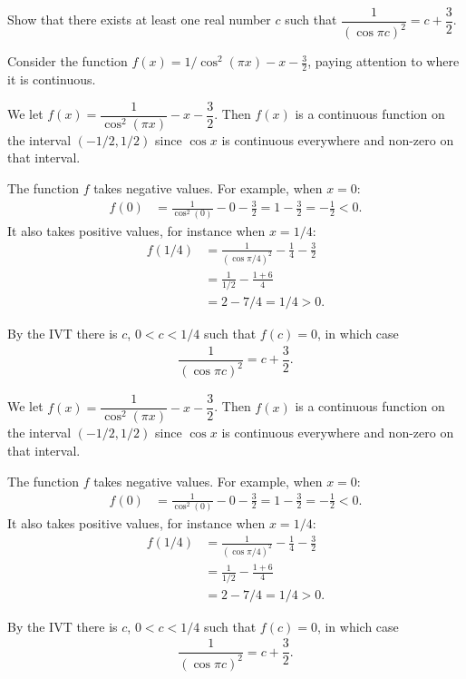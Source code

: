 \begin{question}[2015Q]
Show that there exists at least one real number $c$ such that
$\dfrac{1}{(\cos\pi c)^2} = c+\dfrac{3}{2}$.
\end{question}
\begin{hint}
Consider the function $f(x)=1/\cos^2(\pi x)-x-\frac{3}{2}$, paying attention to where it is continuous.
\end{hint}
\begin{answer}
We let $f(x)=\dfrac{1}{\cos^2(\pi x)}-x-\dfrac{3}{2}$. Then $f(x)$ is a continuous function on the
interval $(-1/2, 1/2)$ since $\cos x$ is continuous everywhere and non-zero on that
interval.

The function $f$ takes negative values.  For example, when $x=0$:
\begin{align*}
f(0) &= \frac{1}{\cos^2(0)} - 0 - \frac{3}{2} = 1-\frac{3}{2} = -\frac{1}{2} <0.
\end{align*}
It also takes positive values, for instance when $x=1/4$:
\begin{align*}
f(1/4) &= \frac{1}{(\cos \pi/4)^2} - \frac{1}{4} - \frac{3}{2} \\
  &= \frac{1}{1/2} - \frac{1+6}{4} \\
  &= 2 - 7/4 = 1/4 >0.
\end{align*}

By the IVT there is $c$, $0<c<1/4$ such that $f(c)=0$, in which case
\begin{align*}
\dfrac{1}{(\cos\pi c)^2} = c+\dfrac{3}{2}.
\end{align*}
\end{answer}
\begin{solution}
We let $f(x)=\dfrac{1}{\cos^2(\pi x)}-x-\dfrac{3}{2}$. Then $f(x)$ is a continuous function on the
interval $(-1/2, 1/2)$ since $\cos x$ is continuous everywhere and non-zero on that
interval.

The function $f$ takes negative values.  For example, when $x=0$:
\begin{align*}
f(0) &= \frac{1}{\cos^2(0)} - 0 - \frac{3}{2} = 1-\frac{3}{2} = -\frac{1}{2} <0.
\end{align*}
It also takes positive values, for instance when $x=1/4$:
\begin{align*}
f(1/4) &= \frac{1}{(\cos \pi/4)^2} - \frac{1}{4} - \frac{3}{2} \\
  &= \frac{1}{1/2} - \frac{1+6}{4} \\
  &= 2 - 7/4 = 1/4 >0.
\end{align*}

By the IVT there is $c$, $0<c<1/4$ such that $f(c)=0$, in which case
\begin{align*}
\dfrac{1}{(\cos\pi c)^2} = c+\dfrac{3}{2}.
\end{align*}
\end{solution}







